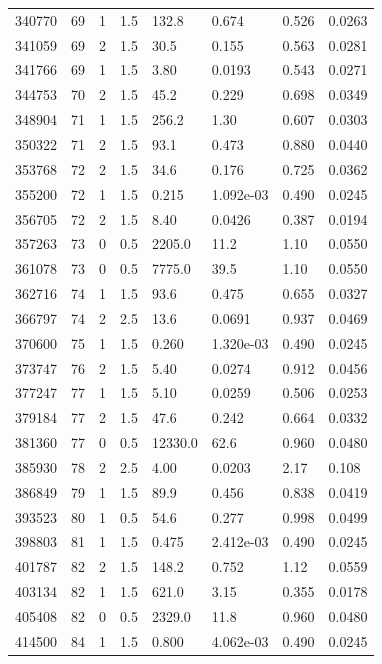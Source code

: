 \documentclass[preview]{standalone}
\begin{document}
{{{{\begin{tabular}{L{1.2cm}C{1.2cm} C{0.3cm}C{0.5cm} C{1.4cm}C{1.4cm} C{1.4cm}C{1.4cm}}
  340770  &    69  & 1     & 1.5 &  132.8  & 0.674  & 0.526 &  0.0263   \\ 
  341059  &    69  & 2     & 1.5 &  30.5  & 0.155  & 0.563 &  0.0281   \\ 
  341766  &    69  & 1     & 1.5 &  3.80  & 0.0193  & 0.543 &  0.0271   \\ 
  344753  &    70  & 2     & 1.5 &  45.2  & 0.229  & 0.698 &  0.0349   \\ 
  348904  &    71  & 1     & 1.5 &  256.2  & 1.30  & 0.607 &  0.0303   \\ 
  350322  &    71  & 2     & 1.5 &  93.1  & 0.473  & 0.880 &  0.0440   \\ 
  353768  &    72  & 2     & 1.5 &  34.6  & 0.176  & 0.725 &  0.0362   \\ 
  355200  &    72  & 1     & 1.5 &  0.215  & 1.092e-03  & 0.490 &  0.0245   \\ 
  356705  &    72  & 2     & 1.5 &  8.40  & 0.0426  & 0.387 &  0.0194   \\ 
  357263  &    73  & 0     & 0.5 &  2205.0  & 11.2  & 1.10 &  0.0550   \\ 
  361078  &    73  & 0     & 0.5 &  7775.0  & 39.5  & 1.10 &  0.0550   \\ 
  362716  &    74  & 1     & 1.5 &  93.6  & 0.475  & 0.655 &  0.0327   \\ 
  366797  &    74  & 2     & 2.5 &  13.6  & 0.0691  & 0.937 &  0.0469   \\ 
  370600  &    75  & 1     & 1.5 &  0.260  & 1.320e-03  & 0.490 &  0.0245   \\ 
  373747  &    76  & 2     & 1.5 &  5.40  & 0.0274  & 0.912 &  0.0456   \\ 
  377247  &    77  & 1     & 1.5 &  5.10  & 0.0259  & 0.506 &  0.0253   \\ 
  379184  &    77  & 2     & 1.5 &  47.6  & 0.242  & 0.664 &  0.0332   \\ 
  381360  &    77  & 0     & 0.5 &  12330.0  & 62.6  & 0.960 &  0.0480   \\ 
  385930  &    78  & 2     & 2.5 &  4.00  & 0.0203  & 2.17 &  0.108   \\ 
  386849  &    79  & 1     & 1.5 &  89.9  & 0.456  & 0.838 &  0.0419   \\ 
  393523  &    80  & 1     & 0.5 &  54.6  & 0.277  & 0.998 &  0.0499   \\ 
  398803  &    81  & 1     & 1.5 &  0.475  & 2.412e-03  & 0.490 &  0.0245   \\ 
  401787  &    82  & 2     & 1.5 &  148.2  & 0.752  & 1.12 &  0.0559   \\ 
  403134  &    82  & 1     & 1.5 &  621.0  & 3.15  & 0.355 &  0.0178   \\ 
  405408  &    82  & 0     & 0.5 &  2329.0  & 11.8  & 0.960 &  0.0480   \\ 
  414500  &    84  & 1     & 1.5 &  0.800  & 4.062e-03  & 0.490 &  0.0245   \\ 
\hline 
\end{tabular} 

}}}}
\end{document}
